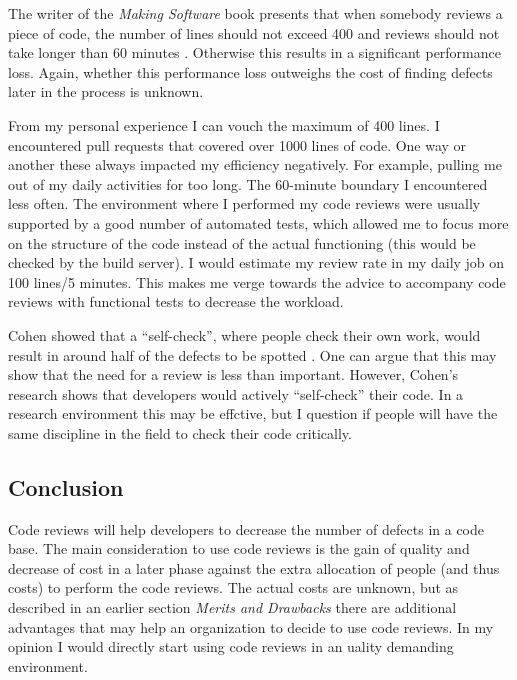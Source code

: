 The writer of the \textit{Making Software} book presents that when somebody reviews a piece of code,
the number of lines should not exceed 400 and reviews should not take longer than 60 minutes \autocite[330-332]{MAKING_SOFTWARE} \autocite[81]{cohen2006best} \autocite[470--471]{Dunsmore:2000:OIF:337180.337343}.
Otherwise this results in a significant performance loss.
Again, whether this performance loss outweighs the cost of finding defects later in the process is unknown.

From my personal experience I can vouch the maximum of 400 lines.
I encountered pull requests that covered over 1000 lines of code.
One way or another these always impacted my efficiency negatively.
For example, pulling me out of my daily activities for too long.
The 60-minute boundary I encountered less often.
The environment where I performed my code reviews were usually supported by a good number of automated tests,
which allowed me to focus more on the structure of the code instead of the actual functioning (this would be checked by the build server).
I would estimate my review rate in my daily job on 100 lines/5 minutes.
This makes me verge towards the advice to accompany code reviews with functional tests to decrease the workload.

Cohen showed that a ``self-check'', where people check their own work, would result in around half of the defects to be spotted \autocite[336]{MAKING_SOFTWARE}.
One can argue that this may show that the need for a review is less than important.
However, Cohen's research shows that developers would actively ``self-check'' their code.
In a research environment this may be effctive, but I question if people will have the same discipline in the field to check their code critically.

\subsection*{Conclusion}

Code reviews will help developers to decrease the number of defects in a code base.
The main consideration to use code reviews is the gain of quality and decrease of cost in a later phase against the extra allocation of people (and thus costs) to perform the code reviews.
The actual costs are unknown, but as described in an earlier section \textit{Merits and Drawbacks} there are additional advantages that may help an organization to decide to use code reviews.
In my opinion I would directly start using code reviews in an uality demanding environment.